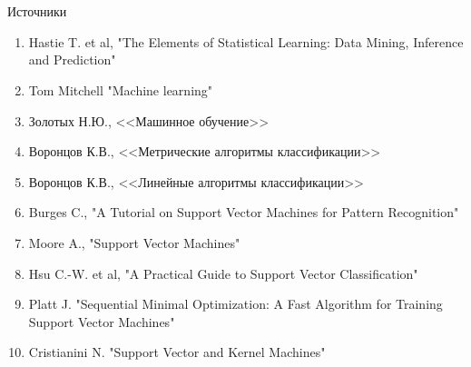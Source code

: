 \documentclass[red,unicode]{beamer}
\begin{document}
\section{}
\begin{frame}{Источники}
\begin{enumerate}
	\item Hastie T. et al, "The Elements of Statistical Learning: Data Mining, Inference and Prediction"
	\item Tom Mitchell "Machine learning"
	\item Золотых Н.Ю., <<Машинное обучение>>
	\item Воронцов К.В., <<Метрические алгоритмы классификации>>
	\item Воронцов К.В., <<Линейные алгоритмы классификации>>
	\item Burges C., "A Tutorial on Support Vector Machines for Pattern Recognition"
	\item Moore A., "Support Vector Machines"
	\item Hsu C.-W. et al, "A Practical Guide to Support Vector Classification"
	\item Platt J. "Sequential Minimal Optimization: A Fast Algorithm for Training Support Vector Machines"
	\item Cristianini N. "Support Vector and Kernel Machines"
\end{enumerate}
\end{frame}
\end{document}

